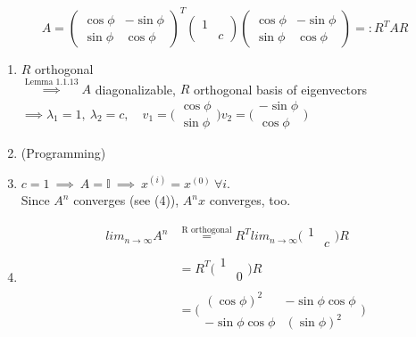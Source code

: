 \begin{SolutionSheet}[\ref{sheet2}]
  \begin{Solution} \phantom{A}\\
    \begin{equation*}
      A =\begin{pmatrix} \cos\phi & -\sin\phi\\
        \sin\phi &  \cos\phi  \end{pmatrix}^T
      \begin{pmatrix}  1 & \\
          & c \end{pmatrix}
      \begin{pmatrix} \cos\phi & -\sin\phi\\
        \sin\phi &  \cos\phi \end{pmatrix} =: R^T A R
      \end{equation*}
    \begin{enumerate}
      \item $R$ orthogonal \\
        $\stackrel{\text{Lemma 1.1.13}}{\implies} A$ diagonalizable, $R$ orthogonal basis of eigenvectors \\
        $\implies \lambda_1 = 1, \ \lambda_2 = c, \quad
        v_1 = \bigl( \begin{smallmatrix} \cos\phi \\ \sin\phi  \end{smallmatrix} \bigr)
        v_2 = \bigl( \begin{smallmatrix} -\sin\phi \\ \cos\phi  \end{smallmatrix} \bigr)$
      \item (Programming)
      \item $c=1 \ \implies \ A = \mathbb{I} \ \implies \ x^{(i)} = x^{(0)} \ \forall i$. \\
        Since $A^n$ converges (see (4)), $A^nx$ converges, too.
      \item \begin{align*}
        lim_{n \to \infty} A^n &\stackrel{\text{R orthogonal}}{=} 
        R^T lim_{n \to \infty}   \bigl( \begin{smallmatrix} 1 & \\ & c \end{smallmatrix} \bigr) R \\
         &= R^T  \bigl( \begin{smallmatrix} 1 & \\ & 0  \end{smallmatrix} \bigr) R \\
         &= \bigl( \begin{smallmatrix} (\cos\phi)^2 & -\sin\phi\cos\phi \\ -\sin\phi\cos\phi & (\sin\phi)^2  \end{smallmatrix} \bigr)
      \end{align*}
    \end{enumerate}
  \end{Solution}

\end{SolutionSheet}


